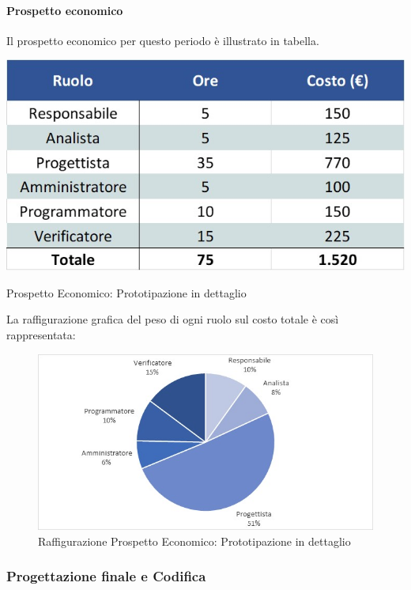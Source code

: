 \paragraph{Prospetto economico}
Il prospetto economico per questo periodo è illustrato in tabella. 
\begin{table}[H]
	\centerline{\includegraphics[scale=0.7]{img/Preventivo/PrototipazioneDettaglioEconomico.jpg}}
	\caption{Prospetto Economico: Prototipazione in dettaglio}
	\clearpage
\end{table}
La raffigurazione grafica del peso di ogni ruolo sul costo totale è così rappresentata:
\begin{figure}[H]
	\centerline{\includegraphics[scale=0.9]{img/Preventivo/Torte/PrototipazioneDettaglio.jpg}}
	\caption{Raffigurazione Prospetto Economico: Prototipazione in dettaglio}
	\clearpage
\end{figure} 
\newpage
\subsubsection{Progettazione finale e Codifica}
